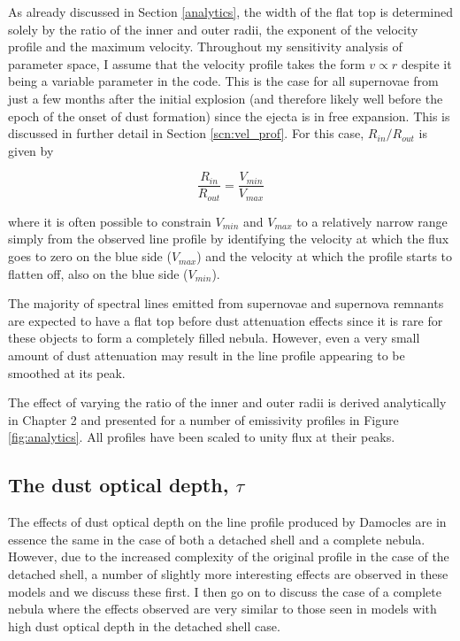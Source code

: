 As already discussed in Section \ref{analytics}, the width of the flat top 
is determined solely by the ratio of the inner and outer radii, the 
exponent of the velocity profile and the maximum velocity.  Throughout my sensitivity analysis of parameter space, I  
assume that the velocity profile takes the form $v \propto r$ despite it being a variable parameter in the code.  This is the case for all supernovae from just a few months after the initial explosion (and therefore likely well before the epoch of the onset of dust formation) since the ejecta is in free expansion.  This is discussed in further detail in Section \ref{scn:vel_prof}.  For this case, $R_{in}/R_{out}$ is given by

\begin{equation}
\frac{R_{in}}{R_{out}}=\frac{V_{min}}{V_{max}}
\end{equation}

\noindent where it is often possible to constrain $V_{min}$ and $V_{max}$ 
to a relatively narrow range simply from the observed line profile by identifying the velocity at which the flux goes to zero on the blue side ($V_{max}$) and the velocity at which the profile starts to flatten off, also on the blue side ($V_{min}$).

The majority of spectral lines emitted from supernovae and supernova 
remnants are expected to have a flat top before dust attenuation effects since it is rare for these 
objects to form a completely filled nebula.  However, even a very small amount of 
dust attenuation may result in the line profile appearing to be smoothed at its 
peak.

The effect of varying the ratio of the inner and outer radii is derived analytically in Chapter 2 and presented for a number of emissivity profiles in Figure \ref{fig:analytics}.   All profiles have been scaled to unity flux at their peaks.



\subsection{The dust optical depth, $\tau$}
\label{tau}

The effects of dust optical depth on the line profile produced by Damocles are in essence the same in the case of both a detached shell and a complete nebula.  However, due to the increased complexity of the original profile in the case of the detached shell, a number of slightly more interesting effects are observed in these models and we discuss these first.  I then go on to discuss the case of a complete nebula where the effects observed are very similar to those seen in models with high dust optical depth in the detached shell case.



